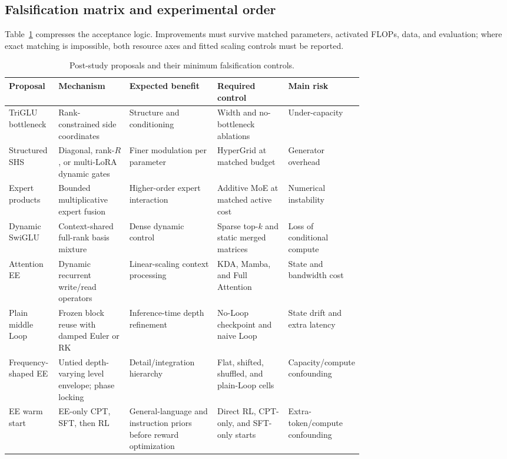 \documentclass[10pt]{article}
\begin{document}
\subsection{Falsification matrix and experimental order}

Table~\ref{tab:followup-matrix} compresses the acceptance logic.  Improvements
must survive matched parameters, activated FLOPs, data, and evaluation; where
exact matching is impossible, both resource axes and fitted scaling controls
must be reported.

\begin{table}[H]
\centering
\footnotesize
\setlength{\tabcolsep}{3.2pt}
\renewcommand{\arraystretch}{1.14}
\caption{Post-study proposals and their minimum falsification controls.}
\label{tab:followup-matrix}
\begin{tabularx}{\linewidth}{@{}
  >{\raggedright\arraybackslash}p{0.14\linewidth}
  >{\raggedright\arraybackslash}p{0.20\linewidth}
  >{\raggedright\arraybackslash}X
  >{\raggedright\arraybackslash}p{0.20\linewidth}
  >{\raggedright\arraybackslash}p{0.16\linewidth}@{}}
\toprule
Proposal & Mechanism & Expected benefit & Required control & Main risk \\
\midrule
TriGLU bottleneck & Rank-constrained side coordinates & Structure and conditioning & Width and no-bottleneck ablations & Under-capacity \\
Structured SHS & Diagonal, rank-$R$, or multi-LoRA dynamic gates & Finer modulation per parameter & HyperGrid at matched budget & Generator overhead \\
Expert products & Bounded multiplicative expert fusion & Higher-order expert interaction & Additive MoE at matched active cost & Numerical instability \\
Dynamic SwiGLU & Context-shared full-rank basis mixture & Dense dynamic control & Sparse top-$k$ and static merged matrices & Loss of conditional compute \\
Attention EE & Dynamic recurrent write/read operators & Linear-scaling context processing & KDA, Mamba, and Full Attention & State and bandwidth cost \\
Plain middle Loop & Frozen block reuse with damped Euler or RK & Inference-time depth refinement & No-Loop checkpoint and naive Loop & State drift and extra latency \\
Frequency-shaped EE & Untied depth-varying level envelope; phase locking & Detail/integration hierarchy & Flat, shifted, shuffled, and plain-Loop cells & Capacity/compute confounding \\
EE warm start & EE-only CPT, SFT, then RL & General-language and instruction priors before reward optimization & Direct RL, CPT-only, and SFT-only starts & Extra-token/compute confounding \\
\bottomrule
\end{tabularx}
\end{table}
\end{document}
